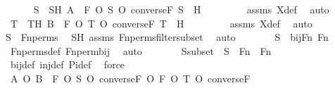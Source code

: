 \begin{isabellebody}
\ \ \ \ \isamarkupfalse%
\ S\ \ SH{\isacharcolon}{\kern0pt}\ {\isachardoublequoteopen}A\ {\isacharequal}{\kern0pt}\ F\ O\ S\ O\ converse{\isacharparenleft}{\kern0pt}F{\isacharparenright}{\kern0pt}{\isachardoublequoteclose}\ {\isachardoublequoteopen}S\ {\isasymin}\ H{\isachardoublequoteclose}\ \isanewline
\ \ \ \ \ \ \isamarkupfalse%
\ assms{}\ X{\isacharunderscore}{\kern0pt}def\ \isamarkupfalse%
\ auto\isanewline
\ \ \ \ \isamarkupfalse%
\ T\ \ TH{\isacharcolon}{\kern0pt}\ {\isachardoublequoteopen}B\ {\isacharequal}{\kern0pt}\ F\ O\ T\ O\ converse{\isacharparenleft}{\kern0pt}F{\isacharparenright}{\kern0pt}{\isachardoublequoteclose}\ {\isachardoublequoteopen}T\ {\isasymin}\ H{\isachardoublequoteclose}\ \isanewline
\ \ \ \ \ \ \isamarkupfalse%
\ assms{}\ X{\isacharunderscore}{\kern0pt}def\ \isamarkupfalse%
\ auto\isanewline
\isanewline
\ \ \ \ \isamarkupfalse%
{\isachardoublequoteopen}S\ {\isasymin}\ Fn{\isacharunderscore}{\kern0pt}perms{\isachardoublequoteclose}\ \isamarkupfalse%
\ SH\ assms\ Fn{\isacharunderscore}{\kern0pt}perms{\isacharunderscore}{\kern0pt}filter{\isacharunderscore}{\kern0pt}subset\ \isamarkupfalse%
\ auto\isanewline
\ \ \ \ \isamarkupfalse%
\ \isamarkupfalse%
\ {\isachardoublequoteopen}S\ {\isasymin}\ bij{\isacharparenleft}{\kern0pt}Fn{\isacharcomma}{\kern0pt}\ Fn{\isacharparenright}{\kern0pt}{\isachardoublequoteclose}\ \isamarkupfalse%
\ Fn{\isacharunderscore}{\kern0pt}perms{\isacharunderscore}{\kern0pt}def\ Fn{\isacharunderscore}{\kern0pt}perm{\isacharprime}{\kern0pt}{\isacharunderscore}{\kern0pt}bij\ \isamarkupfalse%
\ auto\isanewline
\ \ \ \ \isamarkupfalse%
\ \isamarkupfalse%
\ Ssubset\ {\isacharcolon}{\kern0pt}\ {\isachardoublequoteopen}S\ {\isasymsubseteq}\ Fn\ {\isasymtimes}\ Fn{\isachardoublequoteclose}\ \isamarkupfalse%
\ bij{\isacharunderscore}{\kern0pt}def\ inj{\isacharunderscore}{\kern0pt}def\ Pi{\isacharunderscore}{\kern0pt}def\ \isamarkupfalse%
\ force\isanewline
\isanewline
\ \ \ \ \isamarkupfalse%
\ {\isachardoublequoteopen}A\ O\ B\ {\isacharequal}{\kern0pt}\ F\ O\ {\isacharparenleft}{\kern0pt}{\isacharparenleft}{\kern0pt}S\ O\ {\isacharparenleft}{\kern0pt}converse{\isacharparenleft}{\kern0pt}F{\isacharparenright}{\kern0pt}\ O\ F{\isacharparenright}{\kern0pt}{\isacharparenright}{\kern0pt}\ O\ T{\isacharparenright}{\kern0pt}\ O\ converse{\isacharparenleft}{\kern0pt}F{\isacharparenright}{\kern0pt}{\isachardoublequoteclose}\isanewline

\end{isabellebody}
